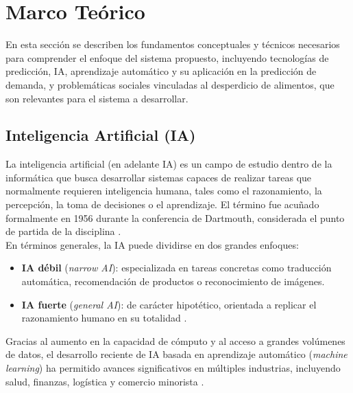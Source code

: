 \newpage %

\section{Marco Teórico}

En esta sección se describen los fundamentos conceptuales y técnicos necesarios para comprender el enfoque del sistema propuesto, incluyendo tecnologías de predicción, IA, aprendizaje automático y su aplicación en la predicción de demanda, y problemáticas sociales vinculadas al desperdicio de alimentos, que son relevantes para el sistema a desarrollar.


\subsection{Inteligencia Artificial (IA)}

La inteligencia artificial (en adelante IA) es un campo de estudio dentro de la informática que busca desarrollar sistemas capaces de realizar tareas que normalmente requieren inteligencia humana, tales como el razonamiento, la percepción, la toma de decisiones o el aprendizaje. El término fue acuñado formalmente en 1956 durante la conferencia de Dartmouth, considerada el punto de partida de la disciplina \parencite{mccarthy1955}.\\

En términos generales, la IA puede dividirse en dos grandes enfoques:

\begin{itemize}
    \item \textbf{IA débil} (\textit{narrow AI}): especializada en tareas concretas como traducción automática, recomendación de productos o reconocimiento de imágenes.
    
    \item \textbf{IA fuerte} (\textit{general AI}): de carácter hipotético, orientada a replicar el razonamiento humano en su totalidad \parencite{russell2021}.
\end{itemize}

Gracias al aumento en la capacidad de cómputo y al acceso a grandes volúmenes de datos, el desarrollo reciente de IA basada en aprendizaje automático (\textit{machine learning}) ha permitido avances significativos en múltiples industrias, incluyendo salud, finanzas, logística y comercio minorista \parencite{jordan2015}.

